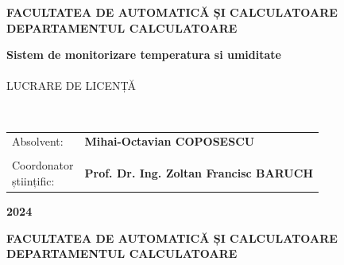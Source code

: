 \pagestyle{fancy}
\setlength{\voffset}{-10pt}
\setlength\headheight{70.0pt}
\renewcommand{\headrulewidth}{0pt}
\cfoot{}
\lfoot{}
\rfoot{}
\renewcommand{\thesisauthor}{Mihai-Octavian COPOSESCU}    %
\renewcommand{\thesismonth}{Iulie}     %
\renewcommand{\thesisyear}{2024}      %
\renewcommand{\thesistitle}{Sistem de monitorizare temperatura si umiditate} %
\renewcommand{\thesissupervisor}{Prof. Dr. Ing. Zoltan Francisc BARUCH} %
\newcommand{\makeThesisTitle}{\textbf{\thesistitletypesize \thesistitle}}
\newcommand{\makeThesisType}{\thesistypetypesize \thesistype}
\newcommand{\department}{\sffamily\bfseries\small FACULTATEA DE AUTOMATICĂ ȘI CALCULATOARE\\
	DEPARTAMENTUL CALCULATOARE} 
\renewcommand{\thesistype}{LUCRARE DE LICENȚĂ}
\newcommand{\uline}[1]{\rule[0pt]{#1}{0.4pt}}
\begin{center}
	{\department}
	
	\vspace{4cm}
	\makeThesisTitle
	~\\~\\
	
	\makeThesisType
	
	~\\\vspace{6.5cm}
	
	\begin{tabular}{p{.3\linewidth}p{.5\linewidth}}
		{\hfill Absolvent:} & {\bf \thesisauthor} \\
		&\\
		{\parbox[t]{\linewidth}{\qquad\qquad\qquad Coordonator\\\hspace*{3.2cm}științific:}}& {\bf \thesissupervisor}\\
	\end{tabular}
	
	\vspace{3cm}
	{\bf \thesisyear}
\end{center}
\newpage
\begin{center}
	{\department}
\end{center}
\vspace{0.5cm}

